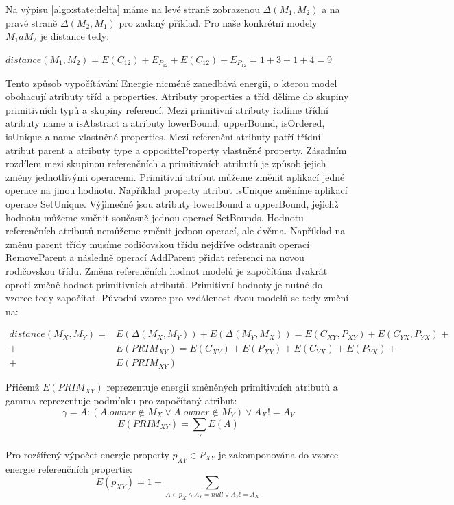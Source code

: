 \documentclass[11pt,twoside,a4paper]{book}
\begin{document}
Na výpisu \ref{algo:state:delta} máme na levé straně zobrazenou
$\Delta(M_1,M_2)$ a na pravé straně $\Delta(M_2,M_1)$ pro zadaný příklad. Pro
naše konkrétní modely $M_1 a M_2$ je distance tedy:

$distance(M_1,M_2) = E(C_{12}) + E_{P_{12}} + E(C_{12}) + E_{P_{12}} = 1 + 3 +
1 + 4 = 9$

Tento způsob vypočítávání Energie nicméně zanedbává energii, o kterou model
obohacují atributy tříd a properties. Atributy properties a tříd dělíme do
skupiny primitivních typů a skupiny referencí. Mezi primitivní atributy řadíme
třídní atributy name a isAbstract a atributy lowerBound, upperBound,
isOrdered, isUnique a name vlastněné properties. Mezi referenční atributy patří
třídní atribut parent a atributy type a oppositteProperty vlastněné property. Zásadním
rozdílem mezi skupinou referenčních a primitivních atributů je způsob jejich
změny jednotlivými operacemi. Primitivní atribut můžeme změnit aplikací jedné
operace na jinou hodnotu. Například property atribut isUnique změníme
aplikací operace SetUnique. Výjimečné jsou atributy lowerBound a upperBound,
jejichž hodnotu můžeme změnit současně jednou operací SetBounds.
Hodnotu referenčních atributů nemůžeme změnit jednou operací, ale
dvěma. Například na změnu parent třídy musíme rodičovskou třídu nejdříve
odstranit operací RemoveParent a následně operací AddParent přidat
referenci na novou rodičovskou třídu. Změna referenčních hodnot modelů je
započítána dvakrát oproti změně hodnot primitivních atributů. Primitivní
hodnoty je nutné do vzorce tedy započítat. Původní vzorec pro vzdálenost dvou
modelů se tedy změní na:

\begin{align} distance(M_X,M_Y) = & E(\Delta(M_X,M_Y)) + E(\Delta(M_Y, M_X)) =
E(C_{XY}, P_{XY}) + E(C_{YX}, P_{YX}) + \nonumber \\ + & E(PRIM_{XY}) = 
E(C_{XY}) + E(P_{XY}) + E(C_{YX}) + E(P_{YX}) + \nonumber \\ + & E(PRIM_{XY})
\nonumber
\end{align}

Přičemž $E(PRIM_{XY})$ reprezentuje energii změněných primitivních atributů a
gamma reprezentuje podmínku pro započítaný atribut:
$$\gamma=A: (A.owner \notin M_{X} \vee A.owner \notin M_{Y})
\vee A_{X} != A_{Y} $$
$$E(PRIM_{XY}) = \sum_{\gamma}E(A)$$

Pro rozšířený výpočet energie property $p_{XY} \in P_{XY}$ je zakomponována do
vzorce energie referenčních propertie:
$$E(p_{XY}) = 1 + \sum_{A \in p_X \wedge A_Y = null \vee A_Y != A_X}$$ 
\end{document}
